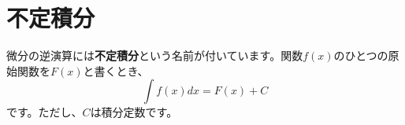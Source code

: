 \documentclass{ltjsarticle}
\begin{document}
\section{不定積分}\label{sec:int}
微分の逆演算には\textbf{不定積分}という名前が付いています。関数$f(x)$のひとつの原始関数を$F(x)$と書くとき、
\[ \int f(x)dx = F(x) + C \]
です。ただし、$C$は積分定数です。
\end{document}

